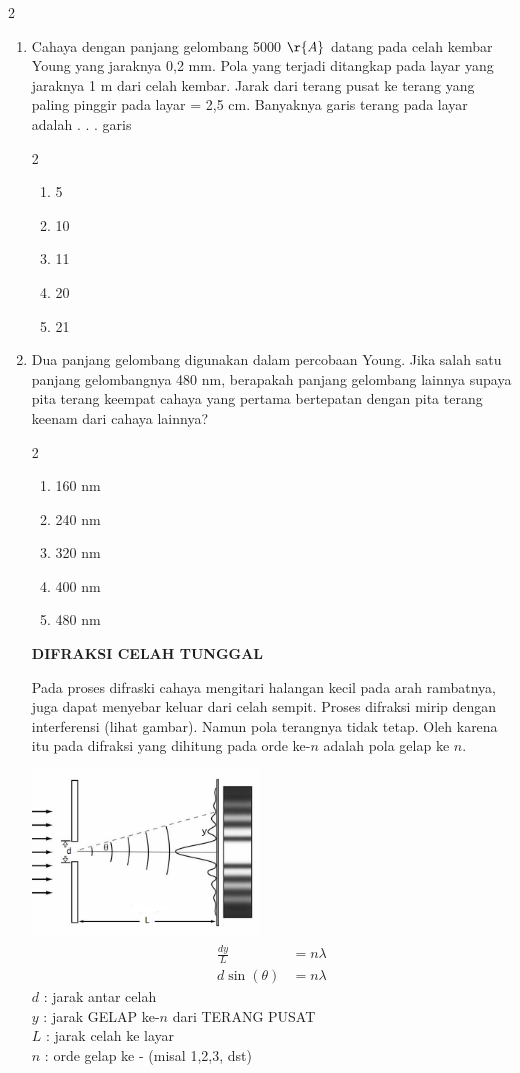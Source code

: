 \documentclass[11pt,a4paper]{extarticle}
\newcommand{\pilgani}[1]{                            \vspace{-0.3cm}\begin{multicols}{2}
 \begin{enumerate}[label=\Alph*., itemsep=0pt,topsep=0pt,leftmargin=*,align=Center]#1                     \end{enumerate}
 \phantom{ini cuma sapi, wedus, dan ayam}
 \end{multicols}}
\begin{document}
\begin{multicols*}{2}
\begin{enumerate}
\item Cahaya dengan panjang gelombang 5000 $\r{A}$ datang pada celah kembar Young yang jaraknya 0,2 mm. Pola yang terjadi ditangkap pada layar yang jaraknya 1 m dari celah kembar. Jarak dari terang pusat ke terang yang paling pinggir pada layar = 2,5 cm. Banyaknya garis terang pada layar adalah . . . garis
\pilgani{
        \item 5
        \item 10
        \item 11
        \item 20
        \item 21
        }

\vspace{3cm} \item Dua panjang gelombang digunakan dalam percobaan Young. Jika salah satu panjang gelombangnya 480 nm, berapakah panjang gelombang lainnya supaya pita terang keempat cahaya yang pertama bertepatan dengan pita terang keenam dari cahaya lainnya?  \pilgani{
        \item 160 nm
        \item 240 nm
        \item 320 nm
       \item 400 nm
        \item 480 nm
} \vspace{3cm} 


\textbf{DIFRAKSI CELAH TUNGGAL}

Pada proses difraski cahaya mengitari halangan kecil pada arah rambatnya, juga dapat menyebar keluar dari celah sempit. Proses difraksi mirip dengan interferensi (lihat gambar). Namun pola terangnya tidak tetap. Oleh karena itu pada difraksi yang dihitung pada orde ke-$n$ adalah pola gelap ke $n$. 

\includegraphics[width=6cm]{pic/singleslit}
\begin{align*}
\frac{dy}{L} &= n \lambda\\
d \sin (\theta) &= n \lambda
\end{align*}
$d$ : jarak antar celah\\
$y$ : jarak GELAP ke-$n$ dari TERANG PUSAT\\
$L$ : jarak celah ke layar\\ 
$n$ : orde gelap ke - (misal 1,2,3, dst)\\




\end{enumerate}
\end{multicols*}
\end{document}
